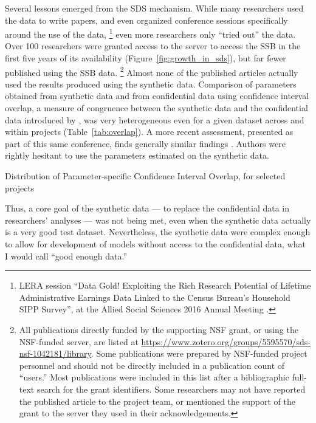 \documentclass[12pt]{article}
\begin{document}
Several lessons emerged from the SDS mechanism. While many researchers used the data to write papers,
%
and even organized conference sessions specifically around the use of the data,%
%
\footnote{LERA session ``Data Gold! Exploiting the Rich Research Potential of Lifetime
Administrative Earnings Data Linked to the Census Bureau’s
Household SIPP Survey'',  at the Allied Social Sciences 2016 Annual Meeting \citep{american_economic_association_allied_2016}. }
%
even more researchers only ``tried out'' the data. Over 100 researchers were granted access to the server to access the SSB in the first five years of its availability (Figure~\ref{fig:growth_in_sds}), but far fewer published using the SSB data.%
%
\footnote{All publications directly funded by the supporting NSF grant, or using the NSF-funded server, are listed at \url{https://www.zotero.org/groups/5595570/sds-nsf-1042181/library}. Some publications were prepared by NSF-funded project personnel and should not be directly included in a publication count of ``users.'' Most publications were included in this list after a bibliographic full-text search for the grant identifiers. Some researchers may not have reported the published article to the project team, or mentioned the support of the grant to the server they used in their acknowledgements.} 
%
Almost none of the published articles actually used the results produced using the synthetic data. Comparison of parameters obtained from synthetic data and from confidential data using confidence interval overlap, a measure of congruence between the synthetic data and the confidential data introduced by \citet{tas2006}, was very heterogeneous even for a given dataset across and within projects (Table~\ref{tab:overlap}). A more recent assessment, presented as part of this same conference, finds generally similar findings \citep{carr-nber-2023,totty-nber-2023}. Authors were rightly  hesitant to use the parameters estimated on the synthetic data. 


\begin{table}[]
    \centering
    
    \caption{Distribution of Parameter-specific Confidence Interval Overlap, for selected projects}
    \label{tab:overlap}
\end{table}

Thus, a core goal of the synthetic data --- to replace the confidential data in researchers' analyses --- was not being met, even when the synthetic data actually is a very good test dataset. Nevertheless, the synthetic data were complex enough to allow for development of models without access to the confidential data, what I would call ``good enough data.''
\end{document}
